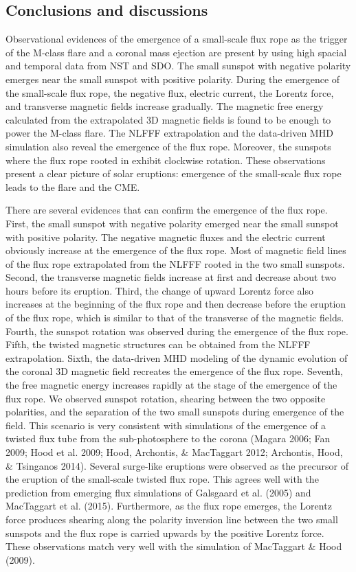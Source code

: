 \documentclass[12pt,preprint]{aastex}
\begin{document}
\begin{CJK*}{UTF8}{gbsn}
\section{Conclusions and discussions}
Observational evidences of the emergence of a small-scale flux rope as the trigger of the M-class flare and a coronal mass ejection are present by using high spacial and temporal data from NST and SDO. The small sunspot with negative polarity emerges near the small sunspot with positive polarity. During the  emergence of the small-scale flux rope, the negative flux, electric current, the Lorentz force, and transverse magnetic fields increase gradually. The magnetic free energy calculated from the extrapolated 3D magnetic fields is found to be enough to power the M-class flare. The NLFFF extrapolation and the data-driven MHD simulation also reveal the emergence of the flux rope. Moreover, the sunspots where the flux rope rooted in exhibit clockwise rotation. These observations present a clear picture of solar eruptions: emergence of the small-scale flux rope leads to the flare and the CME.

There are several evidences that can confirm the emergence of the flux rope. First, the small sunspot with negative polarity emerged near the small sunspot with positive polarity. The negative magnetic fluxes and the electric current obviously increase at the emergence of the flux rope. Most of magnetic field lines of the flux rope extrapolated from the NLFFF rooted in the two small sunspots. Second, the transverse magnetic fields increase at first and decrease about two hours before its eruption. Third, the change of upward Lorentz force also increases at the beginning of the flux rope and then decrease before the eruption of the flux rope, which is similar to that of the transverse of the magnetic fields. Fourth, the sunspot rotation was observed during the emergence of the flux rope. Fifth, the twisted magnetic structures can be obtained from the NLFFF extrapolation. Sixth, the data-driven MHD modeling of the dynamic evolution of the coronal 3D magnetic field recreates the emergence of the flux rope. Seventh, the free magnetic energy increases rapidly at the stage of the emergence of the flux rope. We observed sunspot rotation, shearing between the two opposite polarities, and the separation of the two small sunspots during emergence of the field. This scenario is very consistent with simulations of the emergence of a twisted flux tube from the sub-photosphere to the corona (Magara 2006; Fan 2009; Hood et al. 2009; Hood, Archontis, \& MacTaggart 2012; Archontis, Hood, \& Tsinganos 2014). Several surge-like eruptions were observed as the precursor of the eruption of the small-scale twisted flux rope. This agrees well with the prediction from emerging flux simulations of Galsgaard et al. (2005) and MacTaggart et al. (2015). Furthermore, as the flux rope emerges, the Lorentz force produces shearing along the polarity inversion line between the two small sunspots and the flux rope is carried upwards by the positive Lorentz force. These observations match very well with the simulation of MacTaggart \& Hood (2009).


\end{CJK*}
\end{document}
